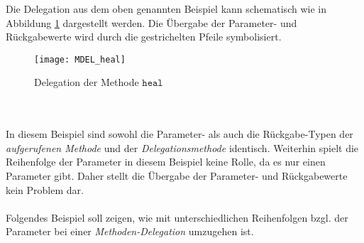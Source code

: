 Die Delegation aus dem oben genannten Beispiel kann schematisch wie in Abbildung \ref{fig:DEL_heal} dargestellt werden. Die Übergabe der Parameter- und Rückgabewerte wird durch die gestrichelten Pfeile symbolisiert.
\begin{figure}[h!]
\centering
\texttt{[image: MDEL\_heal]}
\caption{Delegation der Methode $\texttt{heal}$}
\label{fig:DEL_heal}
\end{figure}
\noindent
\\\\
In diesem Beispiel sind sowohl die Parameter- als auch die Rückgabe-Typen der \emph{aufgerufenen Methode} und der \emph{Delegationsmethode} identisch. Weiterhin spielt die Reihenfolge der Parameter in diesem Beispiel keine Rolle, da es nur einen Parameter gibt. Daher stellt die Übergabe der Parameter- und Rückgabewerte kein Problem dar.
\\\\
Folgendes Beispiel soll zeigen, wie mit unterschiedlichen Reihenfolgen bzgl. der Parameter bei einer \emph{Methoden-Delegation} umzugehen ist.

